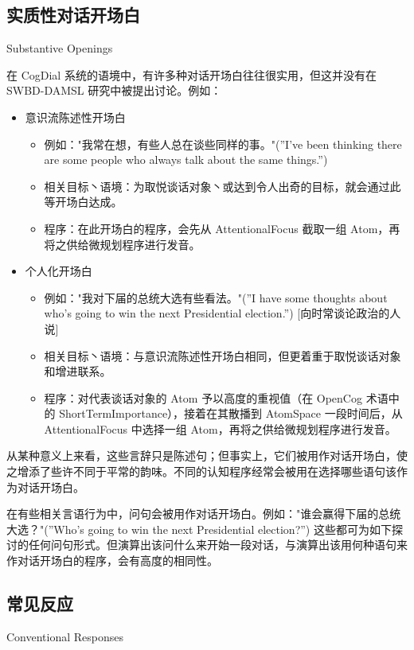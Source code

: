 \subsection{实质性对话开场白}{Substantive Openings}

在 CogDial 系统的语境中，有许多种对话开场白往往很实用，但这并没有在 SWBD-DAMSL 研究中被提出讨论。例如：

\begin{itemize}
\item 意识流陈述性开场白
\begin{itemize}
\item 例如："我常在想，有些人总在谈些同样的事。"(”I’ve been thinking there are some people who always talk about the same things.”)
\item 相关目标丶语境：为取悦谈话对象丶或达到令人出奇的目标，就会通过此等开场白达成。
\item 程序：在此开场白的程序，会先从 AttentionalFocus 截取一组 Atom，再将之供给微规划程序进行发音。
\end{itemize}
\item 个人化开场白
\begin{itemize}
\item 例如："我对下届的总统大选有些看法。"(”I have some thoughts about who’s going to win the next Presidential election.”) [向时常谈论政治的人说]
\item 相关目标丶语境：与意识流陈述性开场白相同，但更着重于取悦谈话对象和增进联系。 
\item 程序：对代表谈话对象的 Atom 予以高度的重视值（在 OpenCog 术语中的 ShortTermImportance），接着在其散播到 AtomSpace 一段时间后，从 AttentionalFocus 中选择一组 Atom，再将之供给微规划程序进行发音。
\end{itemize}
\end{itemize}

从某种意义上来看，这些言辞只是陈述句；但事实上，它们被用作对话开场白，使之增添了些许不同于平常的韵味。不同的认知程序经常会被用在选择哪些语句该作为对话开场白。 

在有些相关言语行为中，问句会被用作对话开场白。例如："谁会赢得下届的总统大选？"(”Who’s going to win the next Presidential election?”) 这些都可为如下探讨的任何问句形式。但演算出该问什么来开始一段对话，与演算出该用何种语句来作对话开场白的程序，会有高度的相同性。

\subsection{常见反应}{Conventional Responses}

